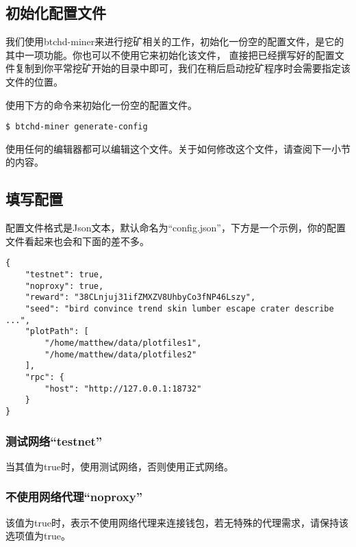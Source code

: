 \subsection{初始化配置文件}
\begin{flushleft}
    我们使用btchd-miner来进行挖矿相关的工作，初始化一份空的配置文件，是它的其中一项功能。你也可以不使用它来初始化该文件，
    直接把已经撰写好的配置文件复制到你平常挖矿开始的目录中即可，我们在稍后启动挖矿程序时会需要指定该文件的位置。
\end{flushleft}
\begin{flushleft}
    使用下方的命令来初始化一份空的配置文件。
\end{flushleft}
\scriptsize
\begin{verbatim}
$ btchd-miner generate-config
\end{verbatim}
\normalsize
\begin{flushleft}
    使用任何的编辑器都可以编辑这个文件。关于如何修改这个文件，请查阅下一小节的内容。
\end{flushleft}
\subsection{填写配置}
\begin{flushleft}
    配置文件格式是Json文本，默认命名为``config.json''，下方是一个示例，你的配置文件看起来也会和下面的差不多。
\end{flushleft}
\scriptsize
\begin{verbatim}
{
    "testnet": true,
    "noproxy": true,
    "reward": "38CLnjuj31ifZMXZV8UhbyCo3fNP46Lszy",
    "seed": "bird convince trend skin lumber escape crater describe ...",
    "plotPath": [
        "/home/matthew/data/plotfiles1",
        "/home/matthew/data/plotfiles2"
    ],
    "rpc": {
        "host": "http://127.0.0.1:18732"
    }
}
\end{verbatim}
\normalsize
\subsubsection{测试网络``testnet''}
\begin{flushleft}
    当其值为true时，使用测试网络，否则使用正式网络。
\end{flushleft}
\subsubsection{不使用网络代理``noproxy''}
\begin{flushleft}
    该值为true时，表示不使用网络代理来连接钱包，若无特殊的代理需求，请保持该选项值为true。
\end{flushleft}

